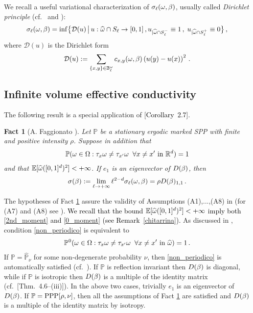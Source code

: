 \documentclass[12pt,a4paper,reqno]{amsart}
\newtheorem{Fact}[Theorem]{Fact}
\newcommand{\cD}{\ensuremath{\mathcal D}}
\newcommand{\bbB}{{\ensuremath{\mathbb B}} }
\newcommand{\bbE}{{\ensuremath{\mathbb E}} }
\newcommand{\bbP}{{\ensuremath{\mathbb P}} }
\newcommand{\bbR}{{\ensuremath{\mathbb R}} }
\let\O=\Omega \let\P=\Pi   \let\Ps=\Psi \let\Si=\Sigma \let\X=\Xi
\newcommand{\rosso}{\textcolor{black}} %
\newcommand{\vvv}{\textcolor{black}} %
\newcommand{\be}{\begin{equation}}
\newcommand{\en}{\end{equation}}
\newcommand{\vpz}{\vvv{\bbP^{\hspace{0.013cm}0} }}
\begin{document}
We recall 
a useful variational  characterization of $\sigma_\ell(\omega, \beta) $, usually called \emph{Dirichlet principle}  (cf.~\cite[Eq.~\rosso{(24)} and \rosso{Lemma~5.2}]{Fhom2} and \rosso{\cite[Exercise~1.3.11]{DS}}):
\be\label{papero}
\s_\ell (\o,\b)=\inf \bigl\{ \cD(u) \,\big{|} \, u: \widehat \o \cap S_\ell \to [0,1]\,, u_{|\widehat \o \cap S_\ell^-} \equiv 1
\,, \; u_{|\widehat \o \cap S_\ell^+}\equiv 0 \bigr\}\,,
\en
where $\cD(u)$ is the Dirichlet form
\[ \cD(u) := \sum _{\{x,y\} \in \bbB^\o_\ell }c_{x,y}(\o,\b) \left( u(y)- u(x) \right)^2\,.
\]

\subsection{Infinite volume effective conductivity}
The following result is a special application of  \cite{Fhom2}[\rosso{Corollary~2.7}].


\begin{Fact}[A. Faggionato  \cite{Fhom2}] \label{teo_eff_cond}
Let $\bbP$ be a stationary ergodic marked SPP  with finite and positive intensity $\rho$. Suppose in addition that 
\be\label{non_periodico}\bbP ( \o \in \O:  \t_x\o\not = \t_{x'} \o  \; \; \forall x\not =x' \text{ in }\rosso{\bbR^d})=1
\en
and that 
 $ \bbE[ \widehat{\o} ([0,1]^d)^2 ]  <+\infty$. 
If $e_1$ is an eigenvector of $D(\beta)$, then 
\be\label{nanna}
\s(\b):=\lim _{\ell \to +\infty} \ell^{2-d} \s_\ell(\o,\b)=\rho  \rosso{D(\b)_{1,1}}\,.
\en
\end{Fact}

The hypotheses of Fact \ref{teo_eff_cond} assure the validity of Assumptions (A1),...,(A8) in \cite[Section~2]{Fhom2} (for (A7) and (A8) see \cite[Section~5.4]{Fhom1}). \rosso{We recall that the bound $ \bbE[ \widehat{\o} ([0,1]^d)^2 ]  <+\infty$ imply both \eqref{2nd_moment} and \eqref{0_moment} (see Remark~\ref{chitarrina}).}
As discussed in \cite[Section~2]{FSS}, condition 
\eqref{non_periodico}
 is equivalent to 
\be\label{non_periodico_bis}
\vpz ( \o \in \O:  \t_x\o\not = \t_{x'} \o  \; \; \forall x\not =x' \text{ in } \widehat{\o})=1\,.
\en
If $\bbP=\hat \bbP_{\nu}$ for some non-degenerate probability $\nu$, then \eqref{non_periodico} is automatically satisfied (cf.~\cite[Section~2]{FSS}).
If $\bbP$ is reflection invariant  then $D(\beta)$ is diagonal, while if $\bbP$ is isotropic then $D(\beta)$ is a multiple of the identity  matrix (cf.~\cite{demasi}[Thm.~4.6--(iii)]). In the above two cases, trivially $e_1$ is an eigenvector of $D(\beta)$.
If $\bbP={\rm PPP}[\rho,\nu]$, then  all the  assumptions of Fact \ref{teo_eff_cond}  are satisfied  and $D(\beta)$ is a multiple of the identity matrix by isotropy.
\end{document}
